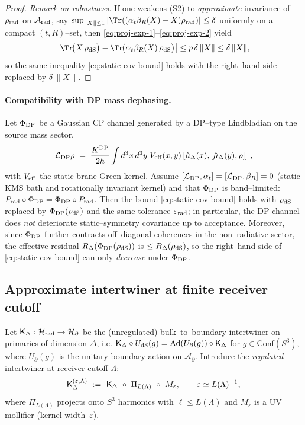 \documentclass[10pt]{article}
\theoremstyle{definition}
\theoremstyle{plain}
\begin{document}
\begin{proof}
\medskip
\noindent\emph{Remark on robustness.}
If one weakens (S2) to \emph{approximate} invariance of $\rho_{\rm rad}$ on $\mathcal A_{\rm rad}$, say
$\sup_{\|X\|\le 1}|\Tr((\alpha_t\beta_R(X)-X)\rho_{\rm rad})|\le \delta$ uniformly on a compact $(t,R)$–set, then
\eqref{eq:proj-exp-1}–\eqref{eq:proj-exp-2} yield
\[
\big|\Tr\!\big(X\,\rho_{\rm dS}\big) - \Tr\!\big(\alpha_t\beta_R(X)\,\rho_{\rm dS}\big)\big|
\le p\,\delta\,\|X\|
\le \delta\,\|X\|,
\]
so the same inequality \eqref{eq:static-cov-bound} holds with the right–hand side replaced by $\delta\,\|X\|$.
\end{proof}

\paragraph{Compatibility with DP mass dephasing.}\label{par:uom-main-243}
Let $\Phi_{\rm DP}$ be a Gaussian CP channel generated by a DP--type Lindbladian on the source mass sector,
\[
\mathcal L_{\rm DP}\rho\;=\;\frac{K^{\rm DP}}{2\hbar}\int d^3x\,d^3y\;V_{\rm eff}(x,y)\,
[\hat\mu_\Delta(x),[\hat\mu_\Delta(y),\rho]]\ ,
\]
with $V_{\rm eff}$ the static brane Green kernel. Assume $[\mathcal L_{\rm DP},\alpha_t]=[\mathcal L_{\rm DP},\beta_R]=0$
(static KMS bath and rotationally invariant kernel) and that $\Phi_{\rm DP}$ is band--limited:
$P_{\rm rad}\circ \Phi_{\rm DP}=\Phi_{\rm DP}\circ P_{\rm rad}$. Then the bound \eqref{eq:static-cov-bound} holds with $\rho_{\rm dS}$
replaced by $\Phi_{\rm DP}(\rho_{\rm dS})$ and the same tolerance $\varepsilon_{\rm rad}$; in particular, the DP channel does
\emph{not} deteriorate static–symmetry covariance up to acceptance. Moreover, since $\Phi_{\rm DP}$ further contracts off–diagonal
coherences in the non–radiative sector, the effective residual $R_\Delta(\Phi_{\rm DP}(\rho_{\rm dS}))$ is $\le R_\Delta(\rho_{\rm dS})$,
so the right–hand side of \eqref{eq:static-cov-bound} can only \emph{decrease} under $\Phi_{\rm DP}$.


\subsection{Approximate intertwiner at finite receiver cutoff}
\label{app:approx-int}

Let ${\sf K}_\Delta:\mathcal H_{\rm rad}\to\mathcal H_\partial$ be the (unregulated) bulk–to–boundary intertwiner on primaries of dimension $\Delta$, i.e.
${\sf K}_\Delta\circ U_{\rm dS}(g)=\mathrm{Ad}(U_\partial(g))\circ{\sf K}_\Delta$ for $g\in\mathrm{Conf}(S^3)$, where $U_\partial(g)$ is the unitary boundary action on $\mathcal A_\partial$.
Introduce the \emph{regulated} intertwiner at receiver cutoff $\Lambda$:
\[
{\sf K}_\Delta^{(\varepsilon,\Lambda)}
\ :=\ {\sf K}_\Delta\ \circ\ \Pi_{L(\Lambda)}\ \circ\ M_\varepsilon,
\qquad \varepsilon\simeq L(\Lambda)^{-1},
\]
where $\Pi_{L(\Lambda)}$ projects onto $S^3$ harmonics with $\ell\le L(\Lambda)$ and $M_\varepsilon$ is a UV mollifier (kernel width~$\varepsilon$).
\end{document}
